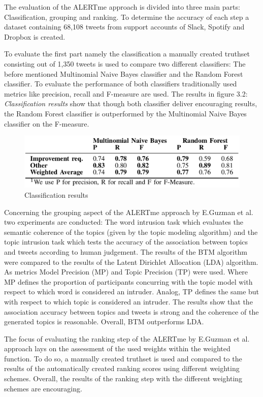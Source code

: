 \documentclass[a4paper,10pt, bibliography=totocnumbered]{scrreprt}
\begin{document}
The evaluation of the ALERTme approach is divided into three main parts: Classification, grouping and ranking. To determine the accuracy of each step a dataset containing 68,108 tweets from support accounts of  Slack, Spotify and Dropbox is created. 

To evaluate the first part namely the classification a manually created truthset consisting out of 1,350 tweets is used to compare two different classifiers: The before mentioned Multinomial Naive Bayes classifier and the Random Forest classifier. To evaluate the performance of both classifiers traditionally used metrics like precision, recall and F-measure are used.
The results in figure 3.2: \textit{Classification results} show that though both classifier deliver encouraging results, the Random Forest classifier is outperformed by the Multinomial Naive Bayes classifier on the F-measure.

\begin{figure}
\centering
\includegraphics[scale=0.2]{images/Thema_5_approach_1_classification.jpeg}
\caption{Classification results}
\label{fig:RankingFunction}
\end{figure}

Concerning the grouping aspect of the ALERTme approach by E.Guzman et al. \cite{Guzman} two experiments are conducted: The word intrusion task which evaluates the semantic coherence of the topics (given by the topic modeling algorithm) and the topic intrusion task which tests the accuracy of the association between topics and tweets according to human judgement.
The results of the BTM algorithm were compared to the results of the Latent Dirichlet Allocation (LDA) algorithm. As metrics Model Precision (MP) and Topic Precision (TP) were used. Where MP defines the proportion of participants concurring with the topic model with respect to which word is considered an intruder. Analog, TP defines the same but with respect to which topic is considered an intruder.
The results show that the association accuracy between topics and tweets is strong and the coherence of the generated topics is reasonable. Overall, BTM outperforms LDA.

The focus of evaluating the ranking step of the ALERTme by E.Guzman et al. \cite{Guzman} approach lays on the assessment of the used weights within the weighted function. To do so, a manually created truthset is used and compared to the results of the automatically created ranking scores using different weighting schemes. Overall, the results of the ranking step with the different weighting schemes are encouraging.
\end{document}
